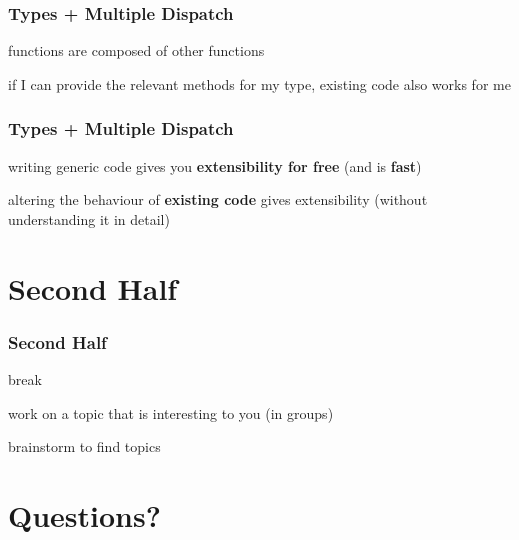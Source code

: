 \documentclass[notes]{beamer}
\newenvironment{wideitemize}{
    \itemize\addtolength{\itemsep}{15pt}\addtolength{\topsep}{10pt}}{\enditemize}
\begin{document}
    \begin{frame}
    \frametitle{Types + Multiple Dispatch}
    \vspace{1cm}
        \begin{wideitemize}
            \item functions are composed of other functions
            \item if I can provide the relevant methods for my type, existing code also works for me
        \end{wideitemize}
        \vspace{1cm}
    \end{frame}

    \begin{frame}
    \frametitle{Types + Multiple Dispatch}
    \vspace{1cm}
        \begin{wideitemize}
            \item writing generic code gives you \textbf{extensibility for free} (and is \textbf{fast})
            \item altering the behaviour of \textbf{existing code} gives extensibility (without understanding it in detail)
        \end{wideitemize}
    \end{frame}


    \section{Second Half}

    \begin{frame}
    \frametitle{Second Half}
    \vspace{1cm}
        \begin{wideitemize}
            \item break
            \item work on a topic that is interesting to you (in groups)
            \item brainstorm to find topics
        \end{wideitemize}
    \end{frame}

	\section{Questions?}
\end{document}
